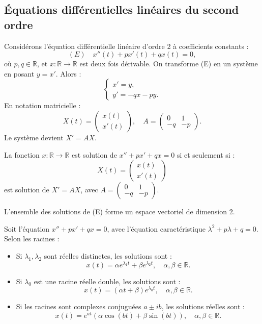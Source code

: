 \subsection{Équations différentielles linéaires du second ordre}
Considérons l'équation différentielle linéaire d'ordre 2 à coefficients constants :
\begin{equation}
(E) \quad x''(t) + p x'(t) + q x(t) = 0,
\end{equation}
où \( p, q \in \mathbb{R} \), et \( x : \mathbb{R} \to \mathbb{R} \) est deux fois dérivable. On transforme (E) en un système en posant \( y = x' \). Alors :
\[
\begin{cases}
x' = y, \\
y' = -q x - p y.
\end{cases}
\]
En notation matricielle :
\[
X(t) = \begin{pmatrix} x(t) \\ x'(t) \end{pmatrix}, \quad A = \begin{pmatrix} 0 & 1 \\ -q & -p \end{pmatrix}.
\]
Le système devient \( X' = AX \).

\begin{proposition}
	La fonction \( x : \mathbb{R} \to \mathbb{R} \) est solution de \( x'' + p x' + q x = 0 \) si et seulement si :
	\[
	X(t) = \begin{pmatrix} x(t) \\ x'(t) \end{pmatrix}
	\]
	est solution de \( X' = AX \), avec \( A = \begin{pmatrix} 0 & 1 \\ -q & -p \end{pmatrix} \).
\end{proposition}

\begin{remarque}
	L'ensemble des solutions de (E) forme un espace vectoriel de dimension 2.
\end{remarque}

\begin{theoreme}
	Soit l'équation \( x'' + p x' + q x = 0 \), avec l'équation caractéristique \( \lambda^2 + p \lambda + q = 0 \). Selon les racines :
	\begin{itemize}
		\item Si \( \lambda_1, \lambda_2 \) sont réelles distinctes, les solutions sont :
		\[
		x(t) = \alpha e^{\lambda_1 t} + \beta e^{\lambda_2 t}, \quad \alpha, \beta \in \mathbb{R}.
		\]
		\item Si \( \lambda_0 \) est une racine réelle double, les solutions sont :
		\[
		x(t) = (\alpha t + \beta) e^{\lambda_0 t}, \quad \alpha, \beta \in \mathbb{R}.
		\]
		\item Si les racines sont complexes conjuguées \( a \pm ib \), les solutions réelles sont :
		\[
		x(t) = e^{a t} (\alpha \cos(b t) + \beta \sin(b t)), \quad \alpha, \beta \in \mathbb{R}.
		\]
	\end{itemize}
\end{theoreme}


